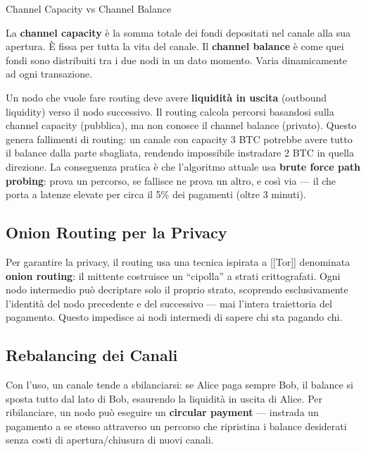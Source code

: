 \documentclass[
  italian,
  openany]{book}
\begin{document}
\begin{calloutdefinition}{Channel Capacity vs Channel Balance}

La \textbf{channel capacity} è la somma totale dei fondi depositati nel
canale alla sua apertura. È fissa per tutta la vita del canale. Il
\textbf{channel balance} è come quei fondi sono distribuiti tra i due
nodi in un dato momento. Varia dinamicamente ad ogni transazione.

\end{calloutdefinition}

Un nodo che vuole fare routing deve avere \textbf{liquidità in uscita}
(outbound liquidity) verso il nodo successivo. Il routing calcola
percorsi basandosi sulla channel capacity (pubblica), ma non conosce il
channel balance (privato). Questo genera fallimenti di routing: un
canale con capacity 3 BTC potrebbe avere tutto il balance dalla parte
sbagliata, rendendo impossibile instradare 2 BTC in quella direzione. La
conseguenza pratica è che l'algoritmo attuale usa \textbf{brute force
path probing}: prova un percorso, se fallisce ne prova un altro, e così
via --- il che porta a latenze elevate per circa il 5\% dei pagamenti
(oltre 3 minuti).

\subsection{Onion Routing per la
Privacy}\label{onion-routing-per-la-privacy}

Per garantire la privacy, il routing usa una tecnica ispirata a
{[}{[}Tor{]}{]} denominata \textbf{onion routing}: il mittente
costruisce un ``cipolla'' a strati crittografati. Ogni nodo intermedio
può decriptare solo il proprio strato, scoprendo esclusivamente
l'identità del nodo precedente e del successivo --- mai l'intera
traiettoria del pagamento. Questo impedisce ai nodi intermedi di sapere
chi sta pagando chi.

\subsection{Rebalancing dei Canali}\label{rebalancing-dei-canali}

Con l'uso, un canale tende a sbilanciarsi: se Alice paga sempre Bob, il
balance si sposta tutto dal lato di Bob, esaurendo la liquidità in
uscita di Alice. Per ribilanciare, un nodo può eseguire un
\textbf{circular payment} --- instrada un pagamento a se stesso
attraverso un percorso che ripristina i balance desiderati senza costi
di apertura/chiusura di nuovi canali.
\end{document}
